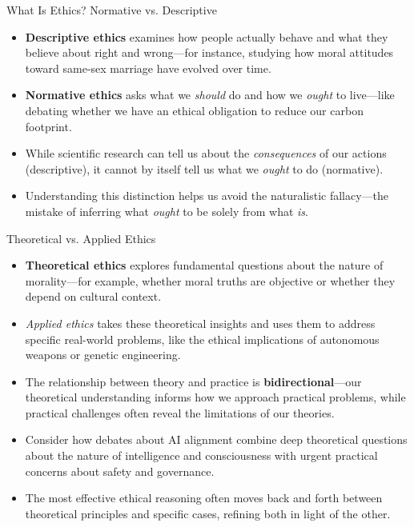 \documentclass[aspectratio=169]{beamer}
\begin{document}
\begin{frame}{What Is Ethics? Normative vs. Descriptive}
\begin{itemize}
\item \textbf{Descriptive ethics} examines how people actually behave and what they believe about right and wrong—for instance, studying how moral attitudes toward same-sex marriage have evolved over time.
\item \textbf{Normative ethics} asks what we \emph{should} do and how we \emph{ought} to live—like debating whether we have an ethical obligation to reduce our carbon footprint.
\item While scientific research can tell us about the \emph{consequences} of our actions (descriptive), it cannot by itself tell us what we \emph{ought} to do (normative).
\item Understanding this distinction helps us avoid the naturalistic fallacy—the mistake of inferring what \emph{ought} to be solely from what \emph{is}.
\end{itemize}
\end{frame}

\begin{frame}{Theoretical vs. Applied Ethics}
\begin{itemize}
\item \textbf{Theoretical ethics} explores fundamental questions about the nature of morality—for example, whether moral truths are objective or whether they depend on cultural context.
\item \emph{Applied ethics} takes these theoretical insights and uses them to address specific real-world problems, like the ethical implications of autonomous weapons or genetic engineering.
\item The relationship between theory and practice is \textbf{bidirectional}—our theoretical understanding informs how we approach practical problems, while practical challenges often reveal the limitations of our theories.
\item Consider how debates about AI alignment combine deep theoretical questions about the nature of intelligence and consciousness with urgent practical concerns about safety and governance.
\item The most effective ethical reasoning often moves back and forth between theoretical principles and specific cases, refining both in light of the other.
\end{itemize}
\end{frame}
\end{document}
